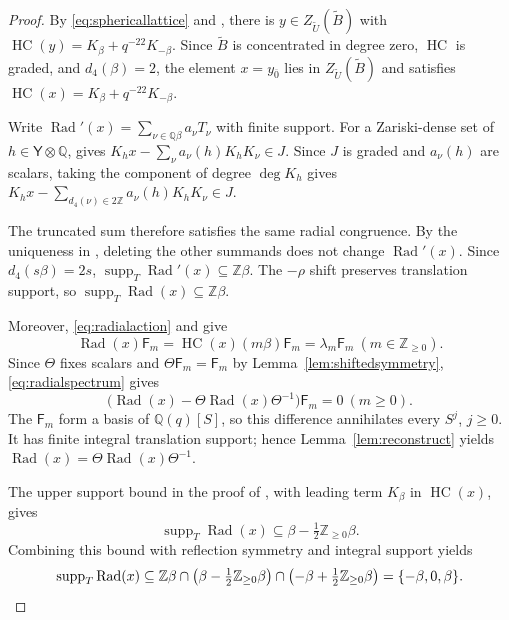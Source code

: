 \documentclass[12pt,reqno]{amsart}
\theoremstyle{plain}
\theoremstyle{definition}
\numberwithin{equation}{section}
\newcommand{\kk}{\mathbb Q(q)}
\newcommand{\Rad}{\operatorname{Rad}}
\newcommand{\HC}{\operatorname{HC}}
\begin{document}
\begin{proof}
	By \eqref{eq:sphericallattice} and \cite[Lemma~3.5]{Sch26},
	there is $y\in Z_{\widetilde U}(\widetilde B)$ with
	$\HC(y)=K_\beta+q^{-22}K_{-\beta}$.
Since $\widetilde B$ is concentrated in degree zero, $\HC$ is
graded, and $d_4(\beta)=2$, the element $x=y_{\overline0}$
lies in $Z_{\widetilde U}(\widetilde B)$ and satisfies
$\HC(x)=K_\beta+q^{-22}K_{-\beta}$.
	
	Write $\Rad'(x)=\sum_{\nu\in\mathbb Q\beta}a_\nu T_\nu$
	with finite support.
	For a Zariski-dense set of $h\in\mathsf Y\otimes\mathbb Q$,
	\cite[Lemma~3.1]{Sch26} gives $K_hx-\sum_\nu a_\nu(h)K_hK_\nu\in J$.
	Since $J$ is graded and $a_\nu(h)$ are scalars, taking
	the component of degree $\deg K_h$ gives $K_hx-
	\sum_{d_4(\nu)\in2\mathbb Z}a_\nu(h)K_hK_\nu\in J$.
	
	The truncated sum therefore satisfies the same radial congruence.
	By the uniqueness in \cite[Lemma~3.1]{Sch26}, deleting the
	other summands does not change $\Rad'(x)$.
	Since $d_4(s\beta)=2s$,
	$\operatorname{supp}_T\Rad'(x)\subseteq\mathbb Z\beta$.
	The $-\rho$ shift preserves translation support, so
	$\operatorname{supp}_T\Rad(x)\subseteq\mathbb Z\beta$.
	
	Moreover, \eqref{eq:radialaction} and
	\cite[Lemma~3.5]{Sch26} give
	\begin{equation}\label{eq:radialspectrum}
		\Rad(x)\mathsf{F}_m
		=\HC(x)(m\beta)\mathsf{F}_m
		=\lambda_m\mathsf{F}_m
		\ (m\in\mathbb Z_{\geq0}).
	\end{equation}
	Since $\Theta$ fixes scalars and
	$\Theta\mathsf{F}_m=\mathsf{F}_m$ by
	Lemma~\ref{lem:shiftedsymmetry}, \eqref{eq:radialspectrum} gives
	\[
	\bigl(\Rad(x)-\Theta\Rad(x)\Theta^{-1}\bigr)
	\mathsf{F}_m=0
	\ (m\geq0).
	\]
	The $\mathsf{F}_m$ form a basis of $\kk[S]$, so this difference
	annihilates every $S^j$, $j\geq0$.
	It has finite integral translation support; hence
	Lemma~\ref{lem:reconstruct} yields $\Rad(x)=\Theta\Rad(x)\Theta^{-1}$.

	The upper support bound in the proof of
	\cite[Theorem~4.23]{Sch26}, with leading term $K_\beta$
	in $\HC(x)$, gives 
	\[
	\operatorname{supp}_T\Rad(x)
	\subseteq\beta-\tfrac12\mathbb Z_{\geq0}\beta.
	\]
	Combining this bound with reflection symmetry and integral
	support yields
	\[
	\operatorname{supp}_T\Rad(x)
	\subseteq
	\mathbb Z\beta
	\cap\left(\beta-\tfrac12\mathbb Z_{\geq0}\beta\right)
	\cap\left(-\beta+\tfrac12\mathbb Z_{\geq0}\beta\right)
	=\{-\beta,0,\beta\}.\qedhere
	\]
\end{proof}
\end{document}
